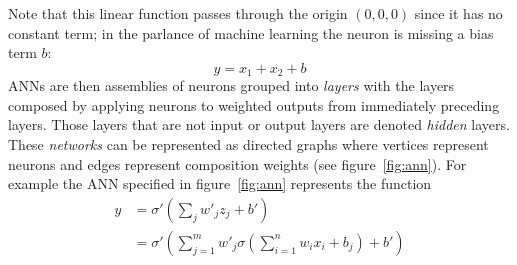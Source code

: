%
Note that this linear function passes through the origin \((0,0,0)\) since it has no constant term; in the parlance of machine learning the neuron is missing a bias term \(b\):
\begin{equation}
    y = x_1 + x_2 + b
    \label{eqn:linearregr}
\end{equation}
%
ANNs are then assemblies of neurons grouped into \textit{layers} with the layers composed by applying neurons to weighted outputs from immediately preceding layers.
%
Those layers that are not input or output layers are denoted \textit{hidden} layers.
%
These \textit{networks} can be represented as directed graphs where vertices represent neurons and edges represent composition weights (see figure~\ref{fig:ann}).
%
For example the ANN specified in figure~\ref{fig:ann} represents the function 
\begin{align}
    y &= \sigma' \left( \sum_j w'_j z_j + b' \right) \\
      &=  \sigma' \left( \sum_{j=1}^m w'_j \sigma\left(\sum_{i=1}^n w_i x_i + b_j\right) + b' \right)
\end{align}



